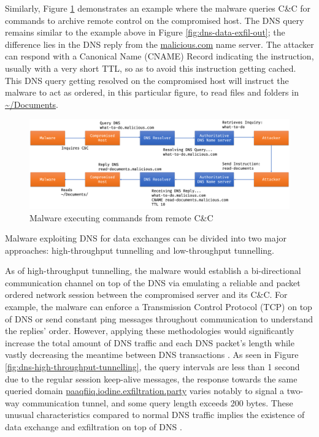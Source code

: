 \documentclass[a4paper]{report}
\begin{document}
Similarly, Figure \ref{fig:dns-data-exfil-cycle} demonstrates an example where the malware queries C\&C for commands to archive remote control on the compromised host. The DNS query remains similar to the example above in Figure \ref{fig:dns-data-exfil-out}; the difference lies in the DNS reply from the \url{malicious.com} name server. The attacker can respond with a Canonical Name (CNAME) Record indicating the instruction, usually with a very short TTL, so as to avoid this instruction getting cached. This DNS query getting resolved on the compromised host will instruct the malware to act as ordered, in this particular figure, to read files and folders in \url{~/Documents}.

\begin{figure}[h!]
  \includegraphics[width=\textwidth]{imgs/dns-data-exfil-cycle.png}
  \caption{Malware executing commands from remote C\&C}
  \label{fig:dns-data-exfil-cycle}
\end{figure}

Malware exploiting DNS for data exchanges can be divided into two major approaches: high-throughput tunnelling and low-throughput tunnelling.

As of high-throughput tunnelling, the malware would establish a bi-directional communication channel on top of the DNS via emulating a reliable and packet ordered network session between the compromised server and its C\&C. For example, the malware can enforce a Transmission Control Protocol (TCP) on top of DNS or send constant ping messages throughout communication to understand the replies' order. However, applying these methodologies would significantly increase the total amount of DNS traffic and each DNS packet's length while vastly decreasing the meantime between DNS transactions \cite{nadler-2017, nadler-201936}. As seen in Figure \ref{fig:dns-high-throughput-tunnelling}, the query intervals are less than 1 second due to the regular session keep-alive messages, the response towards the same queried domain \url{paaqfiiq.iodine.exfiltration.party} varies notably to signal a two-way communication tunnel, and some query length exceeds 200 bytes. These unusual characteristics compared to normal DNS traffic implies the existence of data exchange and exfiltration on top of DNS \cite{nadler-2017}.
\end{document}

